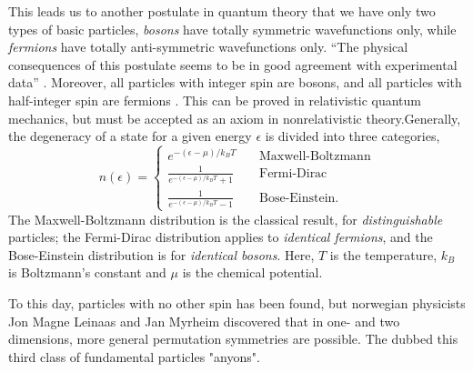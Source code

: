     This leads us to another postulate in quantum theory that we have only two types of 
    basic particles, \emph{bosons} have totally symmetric wavefunctions only, while 
    \emph{fermions} have totally anti-symmetric wavefunctions only. ``The physical 
    consequences of this postulate seems to be in good agreement with experimental data''
    \cite{leinaas1977theory}. Moreover, all particles with integer spin are bosons, 
    and all particles with half-integer spin are fermions
    \cite{fierz1939relativistische,pauli1940connection}. This can be proved in relativistic
    quantum mechanics, but must be accepted as an axiom in nonrelativistic 
    theory\cite{hilborn1995atoms}.Generally, the degeneracy of a state for a given 
    energy $\epsilon$ is divided into three categories,
    \begin{equation}
        n(\epsilon) = \begin{cases}
            e^{-(\epsilon - \mu)/k_BT} &\quad \text{Maxwell-Boltzmann} \\
            \frac{1}{e^{-(\epsilon - \mu)/k_BT} + 1} &\quad \text{Fermi-Dirac} \\
            \frac{1}{e^{-(\epsilon - \mu)/k_BT} - 1} &\quad \text{Bose-Einstein}.
        \end{cases}
    \end{equation}
    The Maxwell-Boltzmann distribution is the classical result, for \emph{distinguishable}
    particles; the Fermi-Dirac distribution applies to \emph{identical fermions}, and 
    the Bose-Einstein distribution is for \emph{identical bosons}. Here, $T$ is the 
    temperature, $k_B$ is Boltzmann's constant and $\mu$ is the chemical potential.

    To this day, particles with no other spin has been found, but norwegian physicists
    Jon Magne Leinaas and Jan Myrheim discovered that in one- and two dimensions, more 
    general permutation symmetries are possible. The dubbed this third class of
    fundamental particles "anyons"\cite{leinaas1977theory}.
        